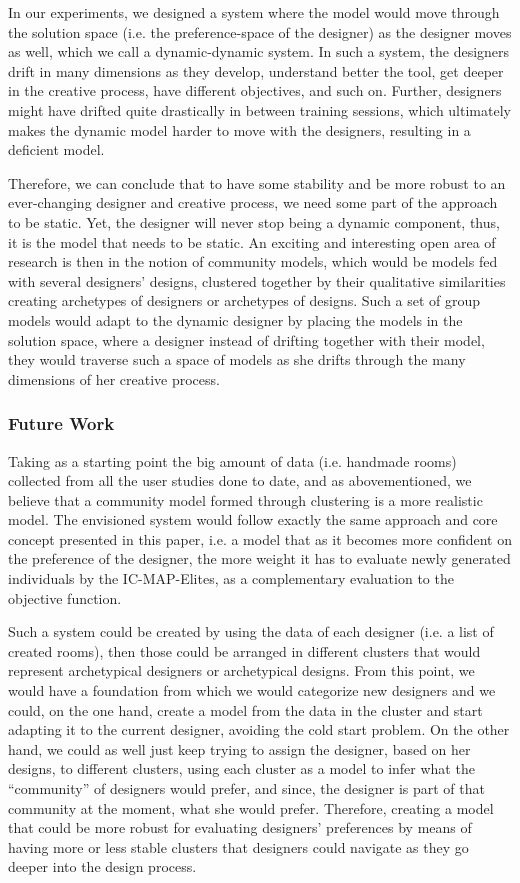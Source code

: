 In our experiments, we designed a system where the model would move through the solution space (i.e. the preference-space of the designer) as the designer moves as well, which we call a dynamic-dynamic system. In such a system, the designers drift in many dimensions as they develop, understand better the tool, get deeper in the creative process, have different objectives, and such on. Further, designers might have drifted quite drastically in between training sessions, which ultimately makes the dynamic model harder to move with the designers, resulting in a deficient model. 

Therefore, we can conclude that to have some stability and be more robust to an ever-changing designer and creative process, we need some part of the approach to be static. Yet, the designer will never stop being a dynamic component, thus, it is the model that needs to be static. An exciting and interesting open area of research is then in the notion of community models, which would be models fed with several designers’ designs, clustered together by their qualitative similarities creating archetypes of designers or archetypes of designs. Such a set of group models would adapt to the dynamic designer by placing the models in the solution space, where a designer instead of drifting together with their model, they would traverse such a space of models as she drifts through the many dimensions of her creative process.

\subsubsection{Future Work}

Taking as a starting point the big amount of data (i.e. handmade rooms) collected from all the user studies done to date, and as abovementioned, we believe that a community model formed through clustering is a more realistic model. The envisioned system would follow exactly the same approach and core concept presented in this paper, i.e. a model that as it becomes more confident on the preference of the designer, the more weight it has to evaluate newly generated individuals by the IC-MAP-Elites, as a complementary evaluation to the objective function. 

Such a system could be created by using the data of each designer (i.e. a list of created rooms), then those could be arranged in different clusters that would represent archetypical designers or archetypical designs. From this point, we would have a foundation from which we would categorize new designers and we could, on the one hand, create a model from the data in the cluster and start adapting it to the current designer, avoiding the cold start problem. On the other hand, we could as well just keep trying to assign the designer, based on her designs, to different clusters, using each cluster as a model to infer what the “community” of designers would prefer, and since, the designer is part of that community at the moment, what she would prefer. Therefore, creating a model that could be more robust for evaluating designers’ preferences by means of having more or less stable clusters that designers could navigate as they go deeper into the design process.

